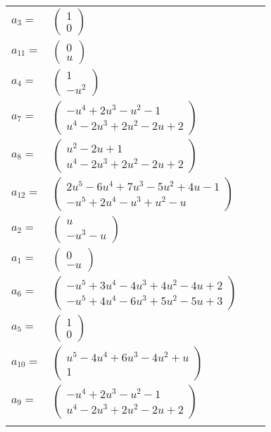 \documentclass[1p]{elsarticle_modified}
\theoremstyle{definition}
\begin{document}
\begin{tabular}{m{7pt} m{180pt} m{7pt} m{180pt} }
\flushright $a_{3}=$&$\begin{pmatrix}1\\0\end{pmatrix}$ \\
\flushright $a_{11}=$&$\begin{pmatrix}0\\u\end{pmatrix}$ \\
\flushright $a_{4}=$&$\begin{pmatrix}1\\- u^2\end{pmatrix}$ \\
\flushright $a_{7}=$&$\begin{pmatrix}- u^4+2 u^3- u^2-1\\u^4-2 u^3+2 u^2-2 u+2\end{pmatrix}$ \\
\flushright $a_{8}=$&$\begin{pmatrix}u^2-2 u+1\\u^4-2 u^3+2 u^2-2 u+2\end{pmatrix}$ \\
\flushright $a_{12}=$&$\begin{pmatrix}2 u^5-6 u^4+7 u^3-5 u^2+4 u-1\\- u^5+2 u^4- u^3+u^2- u\end{pmatrix}$ \\
\flushright $a_{2}=$&$\begin{pmatrix}u\\- u^3- u\end{pmatrix}$ \\
\flushright $a_{1}=$&$\begin{pmatrix}0\\- u\end{pmatrix}$ \\
\flushright $a_{6}=$&$\begin{pmatrix}- u^5+3 u^4-4 u^3+4 u^2-4 u+2\\- u^5+4 u^4-6 u^3+5 u^2-5 u+3\end{pmatrix}$ \\
\flushright $a_{5}=$&$\begin{pmatrix}1\\0\end{pmatrix}$ \\
\flushright $a_{10}=$&$\begin{pmatrix}u^5-4 u^4+6 u^3-4 u^2+u\\1\end{pmatrix}$ \\
\flushright $a_{9}=$&$\begin{pmatrix}- u^4+2 u^3- u^2-1\\u^4-2 u^3+2 u^2-2 u+2\end{pmatrix}$\\&\end{tabular}
\end{document}
